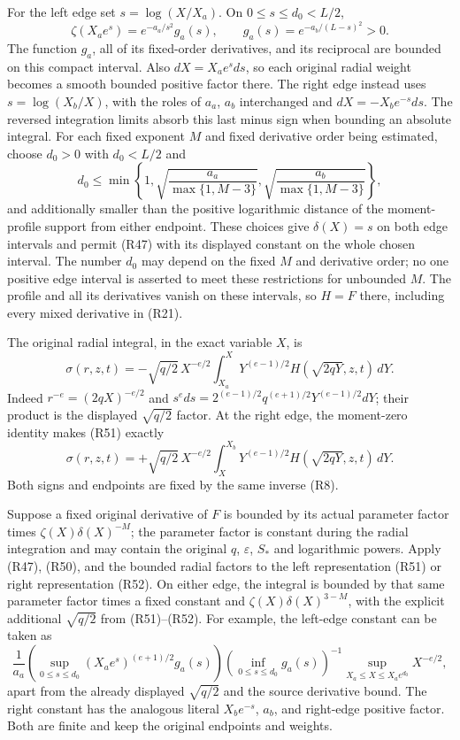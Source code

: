 \documentclass[10pt,a4paper]{article}
\begin{document}
For the left edge set \(s=\log(X/X_a)\). On \(0\le s\le d_0<L/2\), \[
\zeta(X_ae^s)=e^{-a_a/s^2}g_a(s),\qquad
g_a(s)=e^{-a_b/(L-s)^2}>0.
\tag{R50}
\] The function \(g_a\), all of its fixed-order derivatives, and its reciprocal are bounded on this compact interval. Also \(dX=X_ae^sds\), so each original radial weight becomes a smooth bounded positive factor there. The right edge instead uses \(s=\log(X_b/X)\), with the roles of \(a_a\), \(a_b\) interchanged and \(dX=-X_be^{-s}ds\). The reversed integration limits absorb this last minus sign when bounding an absolute integral. For each fixed exponent \(M\) and fixed derivative order being estimated, choose \(d_0>0\) with \(d_0<L/2\) and \[
d_0\le\min\left\{1,\sqrt{\frac{a_a}{\max\{1,M-3\}}},
\sqrt{\frac{a_b}{\max\{1,M-3\}}}\right\},
\tag{R50a}
\] and additionally smaller than the positive logarithmic distance of the moment-profile support from either endpoint. These choices give \(\delta(X)=s\) on both edge intervals and permit (R47) with its displayed constant on the whole chosen interval. The number \(d_0\) may depend on the fixed \(M\) and derivative order; no one positive edge interval is asserted to meet these restrictions for unbounded \(M\). The profile and all its derivatives vanish on these intervals, so \(H=F\) there, including every mixed derivative in (R21).

The original radial integral, in the exact variable \(X\), is \[
\sigma(r,z,t)=-\sqrt{q/2}\,X^{-e/2}
\int_{X_a}^{X}Y^{(e-1)/2}H(\sqrt{2qY},z,t)\,dY.
\tag{R51}
\] Indeed \(r^{-e}=(2qX)^{-e/2}\) and \(s^eds=2^{(e-1)/2}q^{(e+1)/2}Y^{(e-1)/2}dY\); their product is the displayed \(\sqrt{q/2}\) factor. At the right edge, the moment-zero identity makes (R51) exactly \[
\sigma(r,z,t)=+\sqrt{q/2}\,X^{-e/2}
\int_X^{X_b}Y^{(e-1)/2}H(\sqrt{2qY},z,t)\,dY.
\tag{R52}
\] Both signs and endpoints are fixed by the same inverse (R8).

Suppose a fixed original derivative of \(F\) is bounded by its actual parameter factor times \(\zeta(X)\delta(X)^{-M}\); the parameter factor is constant during the radial integration and may contain the original \(q\), \(\varepsilon\), \(S_*\) and logarithmic powers. Apply (R47), (R50), and the bounded radial factors to the left representation (R51) or right representation (R52). On either edge, the integral is bounded by that same parameter factor times a fixed constant and \(\zeta(X)\delta(X)^{3-M}\), with the explicit additional \(\sqrt{q/2}\) from (R51)--(R52). For example, the left-edge constant can be taken as \[
\frac1{a_a}
\left(\sup_{0\le s\le d_0}(X_ae^s)^{(e+1)/2}g_a(s)\right)
\left(\inf_{0\le s\le d_0}g_a(s)\right)^{-1}
\sup_{X_a\le X\le X_ae^{d_0}}X^{-e/2},
\tag{R53}
\] apart from the already displayed \(\sqrt{q/2}\) and the source derivative bound. The right constant has the analogous literal \(X_b e^{-s}\), \(a_b\), and right-edge positive factor. Both are finite and keep the original endpoints and weights.
\end{document}
